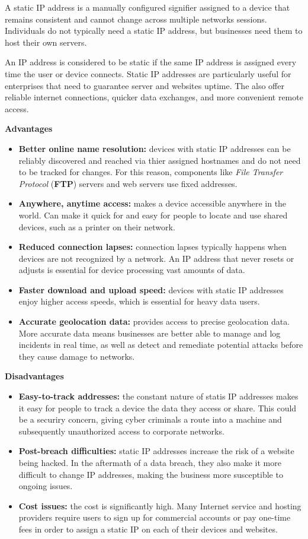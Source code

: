 A static IP address is a manually configured signifier assigned to a device that remains consistent and cannot change across multiple networks sessions. Individuals do not typically need a static IP address, but businesses need them to host their own servers.

An IP address is considered to be static if the same IP address is assigned every time the user or device connects. Static IP addresses are particularly useful for enterprises that need to guarantee server and websites uptime. The also offer reliable internet connections, quicker data exchanges, and more convenient remote access.

\textbf{Advantages}

\begin{itemize}
  \item \textbf{Better online name resolution:} devices with static IP addresses can be reliably discovered and reached via thier assigned hostnames and do not need to be tracked for changes. For this reason, components like \textit{File Transfer Protocol} (\textbf{FTP}) servers and web servers use fixed addresses.
  \item \textbf{Anywhere, anytime access:} makes a device accessible anywhere in the world. Can make it quick for and easy for people to locate and use shared devices, such as a printer on their network.
  \item \textbf{Reduced connection lapses:} connection lapses typically happens when devices are not recognized by a network. An IP address that never resets or adjusts is essential for device processing vast amounts of data.
  \item \textbf{Faster download and upload speed:} devices with static IP addresses enjoy higher access speeds, which is essential for heavy data users.
  \item \textbf{Accurate geolocation data:} provides access to precise geolocation data. More accurate data means businesses are better able to manage and log incidents in real time, as well as detect and remediate potential attacks before they cause damage to networks.
\end{itemize}

\textbf{Disadvantages}

\begin{itemize}
  \item \textbf{Easy-to-track addresses:} the constant nature of statis IP addresses makes it easy for people to track a device the data they access or share. This could be a securiry concern, giving cyber criminals a route into a machine and subsequently unauthorized access to corporate networks.
  \item \textbf{Post-breach difficulties:} static IP addresses increase the risk of a website being hacked. In the aftermath of a data breach, they also make it more difficult to change IP addresses, making the business more susceptible to ongoing issues.
  \item \textbf{Cost issues:} the cost is significantly high. Many Internet service and hosting providers require users to sign up for commercial accounts or pay one-time fees in order to assign a static IP on each of their devices and websites.
\end{itemize}
